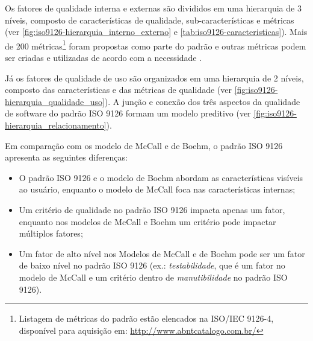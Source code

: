 \documentclass[
	12pt,				%
	openright,			%
	oneside,			%
	a4paper,			%
	english,			%
	brazil,				%
	]{abntex2}
\begin{document}
Os fatores de qualidade interna e externas são divididos em uma hierarquia de 3 níveis, composto de características de qualidade, sub-características e métricas (ver \autoref{fig:iso9126-hierarquia_interno_externo} e \autoref{tab:iso9126-caracteristicas}). Mais de 200 métricas\footnote{Listagem de métricas do padrão estão elencados na ISO/IEC 9126-4, disponível para aquisição em: \url{http://www.abntcatalogo.com.br/}} foram propostas como parte do padrão e outras métricas podem ser criadas e utilizadas de acordo com a necessidade \cite{SURYN2014}.

Já os fatores de qualidade de uso são organizados em uma hierarquia de 2 níveis, composto das características e das métricas de qualidade  (ver \autoref{fig:iso9126-hierarquia_qualidade_uso}). A junção e conexão dos três aspectos da qualidade de software do padrão ISO 9126 formam um modelo preditivo (ver \autoref{fig:iso9126-hierarquia_relacionamento}).

Em comparação com os modelo de McCall e de Boehm, o padrão ISO 9126 apresenta as seguintes diferenças:
\begin{itemize}
    \item O padrão ISO 9126 e o modelo de Boehm abordam as características visíveis ao usuário, enquanto o modelo de McCall foca nas características internas;
    \item Um critério de qualidade no padrão ISO 9126 impacta apenas um fator, enquanto nos modelos de McCall e Boehm um critério pode impactar múltiplos fatores;
    \item Um fator de alto nível nos Modelos de McCall e de Boehm pode ser um fator de baixo nível no padrão ISO 9126 (ex.: \emph{testabilidade}, que é um fator no modelo de McCall e um critério dentro de \emph{manutibilidade} no padrão ISO 9126).
\end{itemize}
\end{document}
